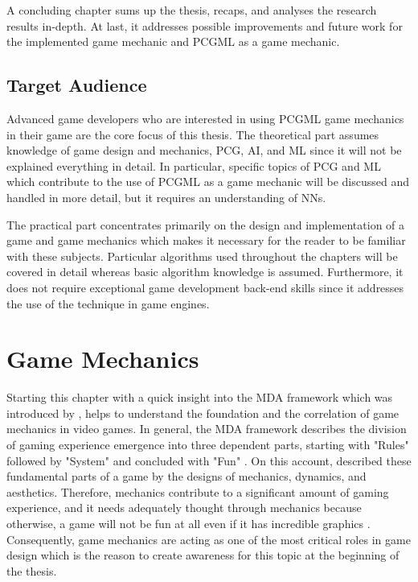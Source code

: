 \documentclass[MGS,Master,english]{twbook}%
\begin{document}
A concluding chapter sums up the thesis, recaps, and analyses the research results in-depth. At last, it addresses possible improvements and future work for the implemented game mechanic and \ac{PCGML} as a game mechanic.

\section{Target Audience}
Advanced game developers who are interested in using \ac{PCGML} game mechanics in their game are the core focus of this thesis. The theoretical part assumes knowledge of game design and mechanics, \ac{PCG}, \ac{AI}, and \ac{ML} since it will not be explained everything in detail. In particular, specific topics of \ac{PCG} and \ac{ML} which contribute to the use of \ac{PCGML} as a game mechanic will be discussed and handled in more detail, but it requires an understanding of \acp{NN}.

The practical part concentrates primarily on the design and implementation of a game and game mechanics which makes it necessary for the reader to be familiar with these subjects. Particular algorithms used throughout the chapters will be covered in detail whereas basic algorithm knowledge is assumed. Furthermore, it does not require exceptional game development back-end skills since it addresses the use of the technique in game engines.

%
%
\clearpage
\chapter{Game Mechanics} \label{gameMechanicsChapter}
Starting this chapter with a quick insight into the \ac{MDA} framework which was introduced by \citep{mechanic::MDA}, helps to understand the foundation and the correlation of game mechanics in video games. In general, the \ac{MDA} framework describes the division of gaming experience emergence into three dependent parts, starting with "Rules" followed by "System" and concluded with "Fun" \cite{mechanic::MDA}.  On this account, \citep{mechanic::MDA} described these fundamental parts of a game by the designs of mechanics, dynamics, and aesthetics. Therefore, mechanics contribute to a significant amount of gaming experience, and it needs adequately thought through mechanics because otherwise, a game will not be fun at all even if it has incredible graphics \cite{gameDesign::gameMechanicsAdvancedGameDesign}. Consequently, game mechanics are acting as one of the most critical roles in game design which is the reason to create awareness for this topic at the beginning of the thesis.
\end{document}
